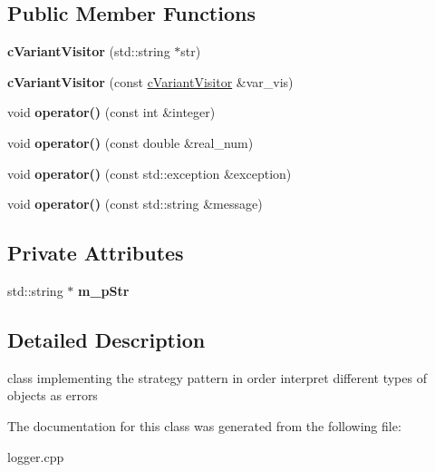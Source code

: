 \subsection*{Public Member Functions}
\begin{DoxyCompactItemize}
\item 
\hypertarget{classengine_1_1cVariantVisitor_a4dfcf482b3b84120ab323aa9303058f0}{{\bfseries c\-Variant\-Visitor} (std\-::string $\ast$str)}\label{classengine_1_1cVariantVisitor_a4dfcf482b3b84120ab323aa9303058f0}

\item 
\hypertarget{classengine_1_1cVariantVisitor_ab49278c7d44ba02e5a411063cb5e5593}{{\bfseries c\-Variant\-Visitor} (const \hyperlink{classengine_1_1cVariantVisitor}{c\-Variant\-Visitor} \&var\-\_\-vis)}\label{classengine_1_1cVariantVisitor_ab49278c7d44ba02e5a411063cb5e5593}

\item 
\hypertarget{classengine_1_1cVariantVisitor_a194e92aa8a44b02c29dbe14a5a049493}{void {\bfseries operator()} (const int \&integer)}\label{classengine_1_1cVariantVisitor_a194e92aa8a44b02c29dbe14a5a049493}

\item 
\hypertarget{classengine_1_1cVariantVisitor_ad72499c182f11280fa498773ffc8bd3c}{void {\bfseries operator()} (const double \&real\-\_\-num)}\label{classengine_1_1cVariantVisitor_ad72499c182f11280fa498773ffc8bd3c}

\item 
\hypertarget{classengine_1_1cVariantVisitor_a1f1bc8f29028034cddb07f1781e56e81}{void {\bfseries operator()} (const std\-::exception \&exception)}\label{classengine_1_1cVariantVisitor_a1f1bc8f29028034cddb07f1781e56e81}

\item 
\hypertarget{classengine_1_1cVariantVisitor_afdfa31a083e06c49529beeea2557dce4}{void {\bfseries operator()} (const std\-::string \&message)}\label{classengine_1_1cVariantVisitor_afdfa31a083e06c49529beeea2557dce4}

\end{DoxyCompactItemize}
\subsection*{Private Attributes}
\begin{DoxyCompactItemize}
\item 
\hypertarget{classengine_1_1cVariantVisitor_a0392f224211e16af4b2c72afa2df4257}{std\-::string $\ast$ {\bfseries m\-\_\-p\-Str}}\label{classengine_1_1cVariantVisitor_a0392f224211e16af4b2c72afa2df4257}

\end{DoxyCompactItemize}


\subsection{Detailed Description}
class implementing the strategy pattern in order interpret different types of objects as errors 

The documentation for this class was generated from the following file\-:\begin{DoxyCompactItemize}
\item 
logger.\-cpp\end{DoxyCompactItemize}
